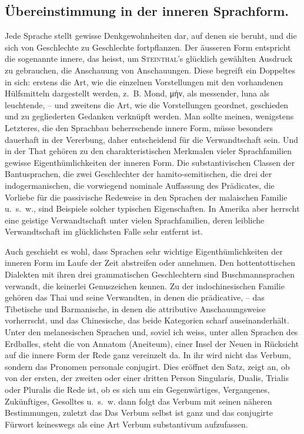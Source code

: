 \subsection*{ Übereinstimmung in der inneren Sprachform.}\label{III.I.I.2Adgamma}
 Jede Sprache stellt gewisse Denkgewohnheiten dar, auf denen sie beruht, und die sich von Geschlechte zu Geschlechte fortpflanzen. Der äusseren Form entspricht die sogenannte innere, das heisst, um \textsc{Steinthal}’s glücklich gewählten Ausdruck zu gebrauchen, die Anschauung von Anschauungen. Diese begreift ein Doppeltes in sich: erstens die Art, wie die einzelnen Vorstellungen mit den vorhandenen Hülfsmitteln dargestellt werden, z.~B. Mond, μήν, als messender, luna als leuchtende, – und zweitens die Art, wie die Vorstellungen geordnet, geschieden und zu gegliederten Gedanken verknüpft werden. Man sollte meinen, wenigstens Letzteres, die den Sprachbau beherrschende innere Form, müsse besonders dauerhaft in der Vererbung, daher entscheidend für die Verwandtschaft sein. Und in der That gehören zu den charakteristischen Merkmalen vieler Sprachfamilien gewisse Eigenthümlichkeiten der inneren Form. Die substantivischen Classen der Bantusprachen, die zwei Geschlechter der hamito-semitischen, die drei der indogermanischen, die vorwiegend nominale Auffassung des Prädicates, die Vorliebe für die passivische Redeweise in den Sprachen der malaischen Familie u.~s.~w., sind Beispiele solcher typischen Eigenschaften. In Amerika aber herrscht eine geistige Verwandtschaft unter vielen Sprachfamilien, deren leibliche Verwandtschaft im glücklichsten Falle sehr entfernt ist.

Auch geschieht es wohl, dass Sprachen sehr wichtige Eigenthümlichkeiten der inneren Form im Laufe der Zeit abstreifen oder annehmen. Den hottentottischen Dialekten mit ihren drei grammatischen Geschlechtern sind Buschmannsprachen verwandt, die keinerlei Genuszeichen kennen. Zu der indo\label{sp.151}chinesischen Familie gehören das Thai  und seine Verwandten, in denen die prädicative, – das Tibetische und Barmanische, in denen die attributive Anschauungsweise vorherrscht, und das Chinesische, das beide Kategorien scharf auseinanderhält. Unter den melanesischen Sprachen und, soviel ich weiss, unter allen Sprachen des Erdballes, steht die von Annatom (Aneiteum), einer Insel der Neuen  in Rücksicht auf die innere Form der Rede ganz vereinzelt da. In ihr wird nicht das Verbum, sondern das Pronomen personale conjugirt. Dies \label{fp.161} eröffnet den Satz, zeigt an, ob von der ersten, der zweiten oder einer dritten Person Singularis, Dualis, Trialis oder Pluralis die Rede ist, ob es sich um ein Gegenwärtiges, Vergangenes, Zukünftiges, Gesolltes u.~s.~w.  dann folgt das Verbum mit seinen näheren Bestimmungen, zuletzt das   Das Verbum selbst ist ganz  und das conjugirte Fürwort keineswegs als eine Art Verbum substantivum aufzufassen. 

